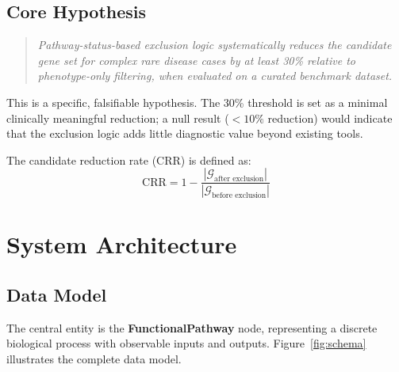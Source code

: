 \documentclass[12pt,a4paper]{article}
\begin{document}
\subsection{Core Hypothesis}

\begin{quote}
\emph{Pathway-status-based exclusion logic systematically reduces the candidate gene set for complex rare disease cases by at least 30\% relative to phenotype-only filtering, when evaluated on a curated benchmark dataset.}
\end{quote}

This is a specific, falsifiable hypothesis. The 30\% threshold is set as a minimal clinically meaningful reduction; a null result ($<10\%$ reduction) would indicate that the exclusion logic adds little diagnostic value beyond existing tools.

The candidate reduction rate (CRR) is defined as:
\begin{equation}
    \text{CRR} = 1 - \frac{|\mathcal{G}_{\text{after exclusion}}|}{|\mathcal{G}_{\text{before exclusion}}|}
\end{equation}

\section{System Architecture}
\label{sec:architecture}

\subsection{Data Model}
\label{sec:datamodel}

The central entity is the \textbf{FunctionalPathway} node, representing a discrete biological process with observable inputs and outputs. Figure~\ref{fig:schema} illustrates the complete data model.
\end{document}
